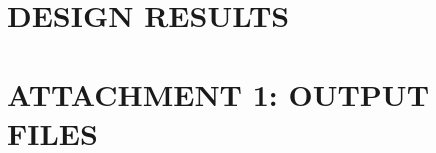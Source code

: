 \documentclass[a4paper,11pt]{article}
\begin{document}
    \pagestyle{fancy}
    \fancyhead{}
    \fancyhead[L]{\calctitle}
    
    \tableofcontents
    
    \newpage
    \section{DESIGN RESULTS}
    
    \newpage
    \section{ATTACHMENT 1: OUTPUT FILES}
    
\end{document}
